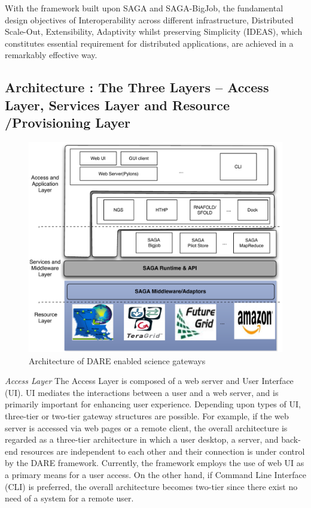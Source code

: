 \documentclass{sig-alternate}
\begin{document}
With the framework built upon SAGA and SAGA-BigJob, the fundamental design objectives of Interoperability across different infrastructure, Distributed Scale-Out, Extensibility, Adaptivity whilst preserving Simplicity (IDEAS), which constitutes essential requirement for distributed applications, are achieved in a remarkably effective way\cite{ideas}.



\subsection{Architecture : The Three Layers -- Access Layer, Services Layer and Resource /Provisioning Layer}

\begin{figure}
 \centering
\includegraphics[scale=0.40]{figures/DAREOutline.pdf}

\caption{\small Architecture of DARE enabled science gateways }
  \label{fig:dare-arch} 
\end{figure}

 

%


\textit{Access Layer}  The Access Layer is composed of a web server and User Interface (UI).  UI mediates the interactions between a user and a web server, and is primarily important for enhancing user experience.  Depending upon types of UI, three-tier or two-tier gateway structures are possible.  For example, if the web server is accessed via web pages or a remote client, the overall architecture is regarded as a three-tier architecture in which a user desktop, a server, and back-end resources are independent to each other and their connection is under control by the DARE framework.  Currently, the framework employs the use of web UI as a primary means for a user access.  On the other hand, if Command Line Interface (CLI) is preferred, the overall architecture becomes two-tier since there exist no need of a system for a remote user.  
\end{document}

